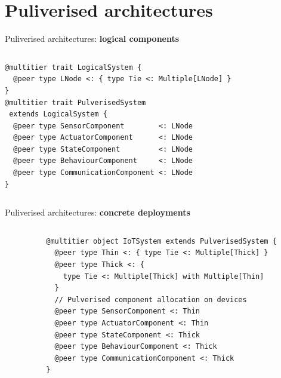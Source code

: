 \documentclass[aspectratio=169]{beamer}
\begin{document}
\section{Puliverised architectures}
\begin{frame}[fragile]{Puliverised architectures: \textbf{logical components}}
  \begin{columns}
    \begin{column}{0.7\textwidth}
      \begin{cardTiny}
        \begin{verbatim}
@multitier trait LogicalSystem {
  @peer type LNode <: { type Tie <: Multiple[LNode] }
}
@multitier trait PulverisedSystem 
 extends LogicalSystem {  
  @peer type SensorComponent        <: LNode 
  @peer type ActuatorComponent      <: LNode
  @peer type StateComponent         <: LNode
  @peer type BehaviourComponent     <: LNode
  @peer type CommunicationComponent <: LNode
}
        \end{verbatim}
      \end{cardTiny}
    \end{column}
    \begin{column}{0.3\textwidth}
    \end{column}
  \end{columns}
\end{frame}
\begin{frame}[fragile]{Puliverised architectures: \textbf{concrete deployments}}
  \begin{columns}

    \begin{column}{0.3\textwidth}
    \end{column}
    \begin{column}{0.7\textwidth}
      \begin{cardTiny}
        \begin{verbatim}
@multitier object IoTSystem extends PulverisedSystem {
  @peer type Thin <: { type Tie <: Multiple[Thick] }
  @peer type Thick <: { 
    type Tie <: Multiple[Thick] with Multiple[Thin]
  }
  // Pulverised component allocation on devices
  @peer type SensorComponent <: Thin
  @peer type ActuatorComponent <: Thin
  @peer type StateComponent <: Thick
  @peer type BehaviourComponent <: Thick
  @peer type CommunicationComponent <: Thick
}
        \end{verbatim}
      \end{cardTiny}
    \end{column}
  \end{columns}
\end{frame}
\end{document}
